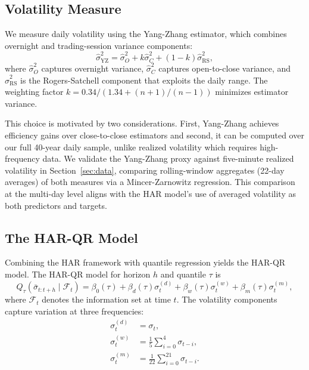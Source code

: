 \subsection{Volatility Measure}
\label{sec:meth-vol-measure}

We measure daily volatility using the Yang-Zhang estimator, which combines
overnight and trading-session variance components:
\begin{equation}
\label{eq:yang-zhang}
\hat{\sigma}^2_{\text{YZ}} = \hat{\sigma}^2_O + k \hat{\sigma}^2_C + (1-k) \hat{\sigma}^2_{\text{RS}},
\end{equation}
where $\hat{\sigma}^2_O$ captures overnight variance, $\hat{\sigma}^2_C$
captures open-to-close variance, and $\hat{\sigma}^2_{\text{RS}}$ is the
Rogers-Satchell component that exploits the daily range. The weighting
factor $k = 0.34/(1.34 + (n+1)/(n-1))$ minimizes estimator variance.

This choice is motivated by two considerations. First, Yang-Zhang achieves
efficiency gains over close-to-close estimators and second,
it can be computed over our full 40-year daily sample, unlike realized volatility
which requires high-frequency data. We validate
the Yang-Zhang proxy against five-minute realized volatility in
Section~\ref{sec:data}, comparing rolling-window aggregates (22-day
averages) of both measures via a Mincer-Zarnowitz regression. This
comparison at the multi-day level aligns with the HAR model's use of
averaged volatility as both predictors and targets.

\subsection{The HAR-QR Model}
\label{sec:meth-har-qr}

Combining the HAR framework with quantile regression yields the HAR-QR
model. The HAR-QR model for horizon $h$ and quantile $\tau$ is
\begin{equation}
\label{eq:har-qr}
Q_{\tau}(\bar{\sigma}_{t:t+h} \mid \mathcal{F}_t) = \beta_0(\tau) + \beta_d(\tau) \sigma_t^{(d)} + \beta_w(\tau) \sigma_t^{(w)} + \beta_m(\tau) \sigma_t^{(m)},
\end{equation}
where $\mathcal{F}_t$ denotes the information set at time $t$. The
volatility components capture variation at three frequencies:
\begin{align}
\sigma_t^{(d)} &= \sigma_t, \label{eq:har-daily} \\
\sigma_t^{(w)} &= \frac{1}{5} \sum_{i=0}^{4} \sigma_{t-i}, \label{eq:har-weekly} \\
\sigma_t^{(m)} &= \frac{1}{22} \sum_{i=0}^{21} \sigma_{t-i}. \label{eq:har-monthly}
\end{align}

